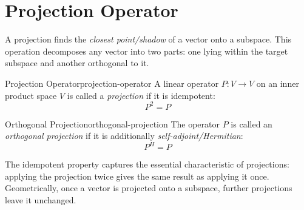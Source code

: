 \documentclass[../../main.tex]{subfiles}
\begin{document}
\section{Projection Operator}
A projection finds the \emph{closest point/shadow} of a vector onto a subspace. This operation decomposes any vector into two parts: one lying within the target subspace and another orthogonal to it.

\begin{definition}{Projection Operator}{projection-operator}
    A linear operator $P: V \to V$ on an inner product space $V$ is called a \emph{projection} if it is idempotent:
    \[
        P^2 = P
    \]
\end{definition}

\begin{corollary}{Orthogonal Projection}{orthogonal-projection}
The operator $P$ is called an \emph{orthogonal projection} if it is additionally \emph{self-adjoint/Hermitian}:
\[
    P^H = P
\]
\end{corollary}

The idempotent property captures the essential characteristic of projections: applying the projection twice gives the same result as applying it once. Geometrically, once a vector is projected onto a subspace, further projections leave it unchanged.
\end{document}
